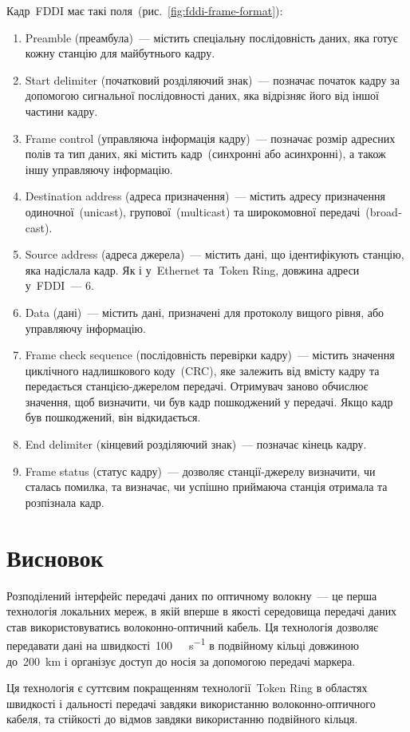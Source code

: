 \documentclass[
	a4paper,
	oneside,
	BCOR = 10mm,
	DIV = 12,
	12pt,
	headings = normal,
]{scrartcl}
\begin{document}
		Кадр~\textenglish{FDDI} має такі поля~(рис.~\ref{fig:fddi-frame-format}):
		\begin{enumerate}
			\item \textenglish{Preamble} (преамбула)~— містить спеціальну послідовність даних, яка готує кожну станцію для майбутнього кадру.
			\item \textenglish{Start delimiter} (початковий розділяючий знак)~— позначає початок кадру за допомогою сигнальної послідовності даних, яка відрізняє його від іншої частини кадру.
			\item \textenglish{Frame control} (управляюча інформація кадру)~— позначає розмір адресних полів та тип даних, які містить кадр~(синхронні або асинхронні), а також іншу управляючу інформацію.
			\item \textenglish{Destination address} (адреса призначення)~— містить адресу призначення одиночної~(\textenglish{unicast}), групової~(\textenglish{multicast}) та широкомовної передачі~(\textenglish{broadcast}).
			\item \textenglish{Source address} (адреса джерела)~— містить дані, що ідентифікують станцію, яка надіслала кадр. Як і у~\textenglish{Ethernet} та~\textenglish{Token Ring}, довжина адреси у~\textenglish{FDDI}~— \SI{6}{\byte}.
			\item \textenglish{Data} (дані)~— містить дані, призначені для протоколу вищого рівня, або управляючу інформацію.
			\item \textenglish{Frame check sequence} (послідовність перевірки кадру)~— містить значення циклічного надлишкового коду~(\textenglish{CRC}), яке залежить від вмісту кадру та передається станцією-джерелом передачі. Отримувач заново обчислює значення, щоб визначити, чи був кадр пошкоджений у передачі. Якщо кадр був пошкоджений, він відкидається.
			\item \textenglish{End delimiter} (кінцевий розділяючий знак)~— позначає кінець кадру.
			\item \textenglish{Frame status} (статус кадру)~— дозволяє станції-джерелу визначити, чи сталась помилка, та визначає, чи успішно приймаюча станція отримала та розпізнала кадр.
		\end{enumerate}

	\section{Висновок}
		Розподілений інтерфейс передачі даних по оптичному волокну~— це перша технологія локальних мереж, в якій вперше в якості середовища передачі даних став використовуватись волоконно-оптичний кабель. Ця технологія дозволяє передавати дані на швидкості~\SI{100}{\mega\bit\per\second} в подвійному кільці довжиною до~\SI{200}{\kilo\metre} і організує доступ до носія за допомогою передачі маркера.

		Ця технологія є суттєвим покращенням технології~\textenglish{Token Ring} в областях швидкості і дальності передачі завдяки використанню волоконно-оптичного кабеля, та стійкості до відмов завдяки використанню подвійного кільця.

	{
	\printbibliography
	}
\end{document}
